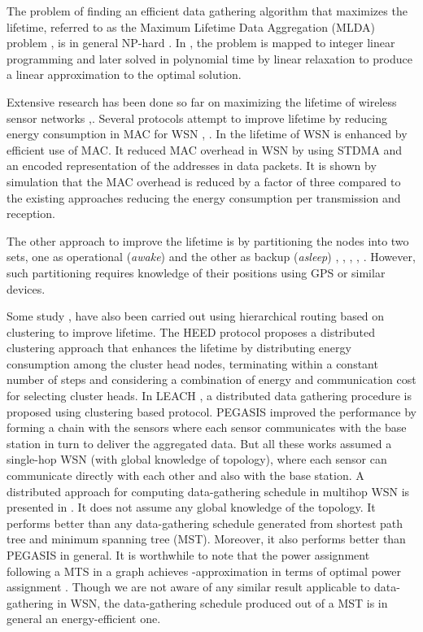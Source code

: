 \documentclass[10pt]{llncs}
\begin{document}
The problem of finding an efficient data gathering algorithm that maximizes the lifetime, referred to as the Maximum Lifetime Data Aggregation (MLDA) problem \cite{Intanagonwiwat00}, \cite{Kalpakis03} is in general NP-hard \cite{Ramanathan00}. In \cite{Kalpakis03}, the problem is mapped to integer linear programming and later solved in polynomial time by linear relaxation to produce a linear approximation to the optimal solution.

Extensive research has been done so far on maximizing the lifetime of wireless sensor networks \cite{Song09},\cite{Wang08}. Several protocols attempt to improve lifetime by reducing energy consumption in MAC for WSN \cite{Ye02}, \cite{Yu07}. In \cite{Schurgers02} the lifetime of WSN is enhanced by efficient use of MAC. It reduced MAC overhead in WSN by using STDMA and an encoded representation of the addresses in data packets. It is shown by simulation that the MAC overhead is reduced by a factor of three compared to the existing approaches reducing the energy consumption per transmission and reception.

The other approach to improve the lifetime is by partitioning the nodes into two sets, one as operational ({\it awake}) and the other as backup ({\it asleep}) \cite{Cerpa02}, \cite{Xu01}, \cite{Chen02}, \cite{Hong08}, \cite{HongTA}. However, such partitioning requires knowledge of their positions using GPS or similar devices. 

Some study \cite{Lin97}, \cite{Banerjee07L} have also been carried out using hierarchical routing based on clustering to improve lifetime. The HEED protocol \cite{Younis04} proposes a distributed clustering approach that enhances the lifetime by distributing energy consumption among the cluster head nodes, terminating within a constant number of steps and considering a combination of energy and communication cost for selecting cluster heads. In LEACH \cite{Heinzelman00}, a distributed data gathering procedure is proposed using clustering based protocol. PEGASIS \cite{Lindsey02} improved the performance by forming a chain with the sensors where each sensor communicates with the base station in turn to deliver the aggregated data. But all these works assumed a single-hop WSN (with global knowledge of topology), where each sensor can communicate directly with each other and also with the base station. A distributed approach for computing data-gathering schedule in multihop WSN is presented in \cite{Bhattacharjee07}. It does not assume any global knowledge of the topology. It performs better than any data-gathering schedule generated from shortest path tree and minimum spanning tree (MST). Moreover, it also performs better than PEGASIS \cite{Lindsey02} in general. It is worthwhile to note that the power assignment following a MTS in a graph achieves -approximation in terms of optimal power assignment \cite{Li05}. Though we are not aware of any similar result applicable to data-gathering in WSN, the data-gathering schedule produced out of a MST is in general an energy-efficient one.
\end{document}
